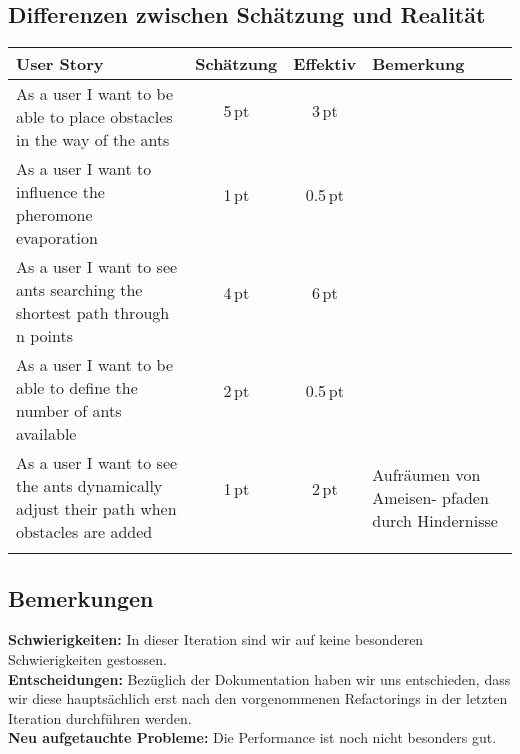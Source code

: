 \subsection*{Differenzen zwischen Schätzung und Realität}

\noindent
\begin{tabular}{| l | c | c | l |}
  \hline
  \bfseries{User Story} & \bfseries{Schätzung} & \bfseries{Effektiv} & \bfseries{Bemerkung}  \\
  \hline
  \multirow{2}{6.5cm}{As a user I want to be able to place obstacles in the way of the ants} & 5\,pt & 3\,pt &   \multirow{2}{4.5cm}{} \\ 
  & & & \\ \hline
  \multirow{2}{6.5cm}{As a user I want to influence the pheromone evaporation} & 1\,pt &0.5\,pt & \multirow{4}{4.5cm}{}  \\
  & & & \\ \hline
  \multirow{2}{6.5cm}{As a user I want to see ants searching the shortest path through n points} & 4\,pt & 6\,pt & \multirow{2}{4.5cm}{Aufgrund von Bug in Kantenselektionslogik} \\
  & & & \\
  \hline
  \multirow{2}{6.5cm}{As a user I want to be able to define the number of ants available} & 2\,pt & 0.5\,pt & \multirow{2}{4.5cm}{} \\
  & & & \\
  \hline
  \multirow{2}{6.5cm}{As a user I want to see the ants dynamically adjust their path when obstacles are added} & 1\,pt & 2\,pt & \multirow{2}{4.5cm}{Aufräumen von Ameisen- pfaden durch Hindernisse} \\
  & & & \\
  & & & \\
  \hline
\end{tabular}



\subsection*{Bemerkungen}

\begin{small}

\noindent \textbf{Schwierigkeiten:} In dieser Iteration sind wir auf keine besonderen Schwierigkeiten gestossen. \\ [-0.25cm]

\noindent \textbf{Entscheidungen:} Bezüglich der Dokumentation haben wir uns entschieden, dass wir diese hauptsächlich erst nach den vorgenommenen Refactorings in der letzten Iteration durchführen werden. \\ [-0.25cm]

\noindent \textbf{Neu aufgetauchte Probleme:} Die Performance ist noch nicht besonders gut.

\end{small}





